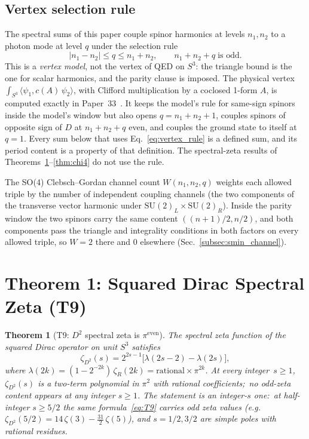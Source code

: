 \documentclass[11pt]{article}
\newtheorem{theorem}{Theorem}
\begin{document}
\subsection{Vertex selection rule}
\label{sec:setup}

The spectral sums of this paper couple spinor harmonics at levels
$n_1, n_2$ to a photon mode at level $q$ under the selection rule
\begin{equation}
  |n_1 - n_2| \le q \le n_1 + n_2, \qquad
  n_1 + n_2 + q \;\text{is odd}.
  \label{eq:vertex_rule}
\end{equation}
This is a \emph{vertex model}, not the vertex of QED on $S^3$: the
triangle bound is the one for scalar harmonics, and the parity clause
is imposed.  The physical vertex
$\int_{S^3} \langle \psi_1, c(A)\,\psi_2 \rangle$, with Clifford
multiplication by a coclosed 1-form $A$, is computed exactly in
Paper~33~\cite{paper33}.  It keeps the model's rule for same-sign spinors inside the
model's window but also opens $q = n_1 + n_2 + 1$, couples spinors of
opposite sign of $D$ at $n_1 + n_2 + q$ even, and couples the ground
state to itself at $q = 1$.  Every sum below that uses
Eq.~\eqref{eq:vertex_rule} is a defined sum, and its period content is
a property of that definition.  The spectral-zeta results of
Theorems~\ref{thm:T9}--\ref{thm:chi4} do not use the rule.

The SO(4) Clebsch--Gordan channel count $W(n_1, n_2, q)$
weights each allowed triple by the number of independent coupling
channels (the two components of the transverse vector harmonic under
$\mathrm{SU}(2)_L \times \mathrm{SU}(2)_R$).  Inside the parity window
the two spinors carry the same content $((n+1)/2, n/2)$, and both
components pass the triangle and integrality conditions in both
factors on every allowed triple, so $W = 2$ there and $0$ elsewhere
(Sec.~\ref{subsec:smin_channel}).

\section{Theorem 1: Squared Dirac Spectral Zeta (T9)}
\label{sec:T9}

\begin{theorem}[T9: $D^2$ spectral zeta is $\pi^{\mathrm{even}}$]
\label{thm:T9}
The spectral zeta function of the squared Dirac operator on unit
$S^3$ satisfies
\begin{equation}
  \zeta_{D^2}(s)
    = 2^{2s-1}\bigl[\lambda(2s{-}2) - \lambda(2s)\bigr],
  \label{eq:T9}
\end{equation}
where $\lambda(2k) = (1 - 2^{-2k})\,\zeta_R(2k)
= \mathrm{rational} \times \pi^{2k}$.
At every integer~$s \ge 1$, $\zeta_{D^2}(s)$ is a two-term polynomial
in $\pi^2$ with rational coefficients;\ no odd-zeta content appears
at any integer $s \ge 1$.  The statement is an integer-$s$ one:\ at
half-integer $s \ge 5/2$ the same formula~\eqref{eq:T9} carries odd zeta
values (e.g.\ $\zeta_{D^2}(5/2) = 14\,\zeta(3) - \tfrac{31}{2}\,\zeta(5)$),
and $s = 1/2, 3/2$ are simple poles with rational residues.
\end{theorem}
\end{document}
